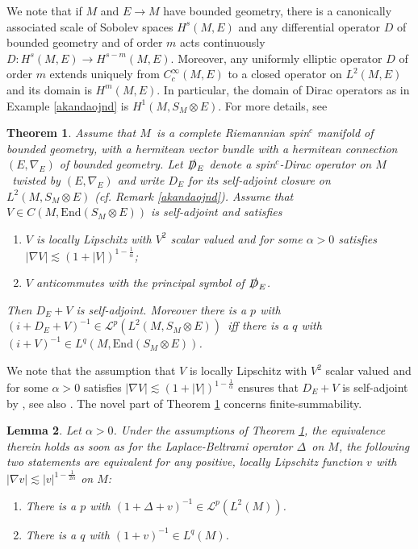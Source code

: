 \documentclass[a4paper,reqno]{amsart}
\numberwithin{equation}{section}
\newtheorem{thm}{Theorem}[section]
\newtheorem{lemma}[thm]{Lemma}
\theoremstyle{definition}
\theoremstyle{remark}
\begin{document}
We note that if $M$ and $E\to M$ have bounded geometry, there is a canonically associated scale of Sobolev spaces $H^s(M,E)$ and any differential operator $D$ of bounded geometry and of order $m$ acts continuously $D:H^s(M,E)\to H^{s-m}(M,E)$. Moreover, any uniformly elliptic operator $D$ of order $m$ extends uniquely from $C^\infty_c(M,E)$ to a closed operator on $L^2(M,E)$ and its domain is $H^m(M,E)$. In particular, the domain of Dirac operators as in Example \ref{akandaojnd} is $H^1(M,S_M\otimes E)$. For more details, see \cite{boundedgeome}


\begin{thm}
\label{finsumthm}
Assume that $M$ is a complete Riemannian spin$^c$ manifold of bounded geometry, with a hermitean vector bundle with a hermitean connection $(E,\nabla_E)$ of bounded geometry. Let $\slashed{D}_E$ denote a spin$^c$-Dirac operator on $M$ twisted by $(E,\nabla_E)$ and write $D_E$ for its self-adjoint closure on $L^2(M,S_M\otimes E)$ (cf. Remark \ref{akandaojnd}). Assume that $V\in C(M,\mathrm{End}(S_M\otimes E))$ is self-adjoint and satisfies
\begin{enumerate}
\item $V$ is locally Lipschitz with $V^2$ scalar valued and for some $\alpha>0$ satisfies $|\nabla V|\lesssim (1+|V|)^{1-\frac{1}{\alpha}}$;
\item $V$ anticommutes with the principal symbol of $\slashed{D}_E$.
\end{enumerate}
Then $D_E+V$ is self-adjoint. Moreover there is a $p$ with $(i+D_E+V)^{-1}\in \mathcal{L}^p(L^2(M,S_M\otimes E))$ iff there is a $q$ with $(i+V)^{-1}\in L^q(M,\mathrm{End}(S_M\otimes E))$.
\end{thm}

We note that the assumption that $V$ is locally Lipschitz with $V^2$ scalar valued and for some $\alpha>0$ satisfies $|\nabla V|\lesssim (1+|V|)^{1-\frac{1}{\alpha}}$ ensures that  $D_E+V$ is self-adjoint by \cite[Theorem 1.1]{leschmes}, see also \cite[Section 7]{leschkaadlocal}. The novel part of Theorem \ref{finsumthm} concerns finite-summability.


\begin{lemma}
\label{reductoscalar}
Let $\alpha>0$. Under the assumptions of Theorem \ref{finsumthm}, the equivalence therein holds as soon as for the Laplace-Beltrami operator $\Delta$ on $M$, the following two statements are equivalent for any positive, locally Lipschitz function $v$ with $|\nabla v|\lesssim |v|^{1-\frac{1}{2\alpha}}$ on $M$:
\begin{enumerate}
\item There is a $p$ with $(1+\Delta+v)^{-1}\in \mathcal{L}^p(L^2(M))$.
\item There is a $q$ with $(1+v)^{-1}\in L^q(M)$.
\end{enumerate}
\end{lemma}
\end{document}
